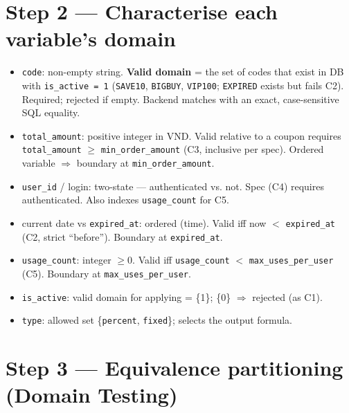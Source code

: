 \documentclass[11pt,a4paper]{article}
\newcommand{\code}[1]{\texttt{#1}}
\newcommand{\dong}{VND} %
\begin{document}
\section{Step 2 --- Characterise each variable's domain}

\begin{itemize}[leftmargin=1.3em]
  \item \code{code}: non-empty string. \textbf{Valid domain} = the set of codes that
        exist in DB with \code{is\_active = 1} (\code{SAVE10}, \code{BIGBUY},
        \code{VIP100}; \code{EXPIRED} exists but fails C2). Required; rejected if empty.
        Backend matches with an exact, case-sensitive SQL equality.
  \item \code{total\_amount}: positive integer in \dong. Valid relative to a coupon
        requires \code{total\_amount} $\ge$ \code{min\_order\_amount} (C3, inclusive per spec).
        Ordered variable $\Rightarrow$ boundary at \code{min\_order\_amount}.
  \item \code{user\_id} / login: two-state --- authenticated vs. not. Spec (C4) requires
        authenticated. Also indexes \code{usage\_count} for C5.
  \item current date vs \code{expired\_at}: ordered (time). Valid iff now $<$
        \code{expired\_at} (C2, strict ``before''). Boundary at \code{expired\_at}.
  \item \code{usage\_count}: integer $\ge 0$. Valid iff \code{usage\_count} $<$
        \code{max\_uses\_per\_user} (C5). Boundary at \code{max\_uses\_per\_user}.
  \item \code{is\_active}: valid domain for applying = \{1\}; \{0\} $\Rightarrow$ rejected (as C1).
  \item \code{type}: allowed set \{\code{percent}, \code{fixed}\}; selects the output formula.
\end{itemize}

\section{Step 3 --- Equivalence partitioning (Domain Testing)}
\end{document}

